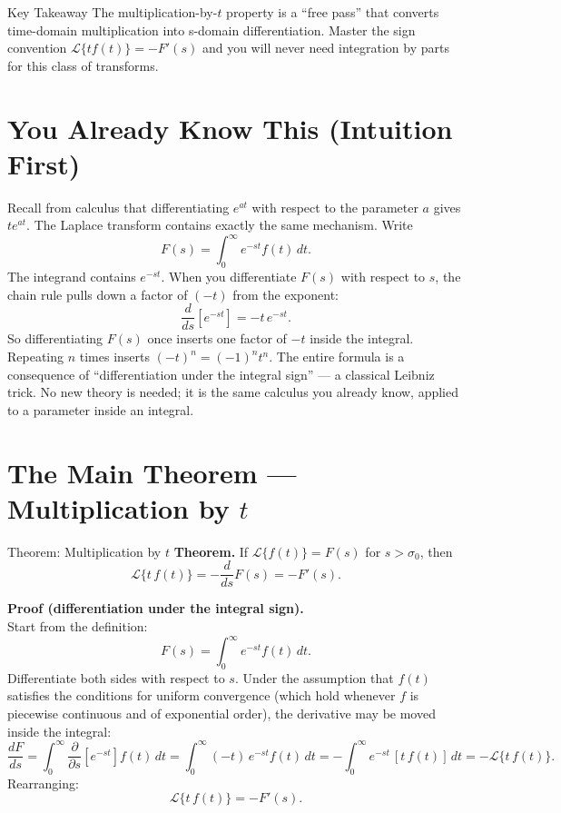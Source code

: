 \documentclass[12pt,a4paper]{article}
\begin{document}
\begin{learnbox}{Key Takeaway}
The multiplication-by-$t$ property is a ``free pass'' that converts time-domain
multiplication into s-domain differentiation. Master the sign convention
$\mathcal{L}\{tf(t)\} = -F'(s)$ and you will never need integration by parts
for this class of transforms.
\end{learnbox}

\section{You Already Know This (Intuition First)}
Recall from calculus that differentiating $e^{at}$ with respect to the parameter
$a$ gives $te^{at}$. The Laplace transform contains exactly the same mechanism.
Write
\[
  F(s) = \int_0^{\infty} e^{-st} f(t)\,dt.
\]
The integrand contains $e^{-st}$. When you differentiate $F(s)$ with respect to
$s$, the chain rule pulls down a factor of $(-t)$ from the exponent:
\[
  \frac{d}{ds}\left[e^{-st}\right] = -t\,e^{-st}.
\]
So differentiating $F(s)$ once inserts one factor of $-t$ inside the integral.
Repeating $n$ times inserts $(-t)^n = (-1)^n t^n$. The entire formula is a
consequence of ``differentiation under the integral sign'' --- a classical
Leibniz trick. No new theory is needed; it is the same calculus you already know,
applied to a parameter inside an integral.

\section{The Main Theorem --- Multiplication by $t$}
\begin{infobox}{Theorem: Multiplication by $t$}
\textbf{Theorem.} If $\mathcal{L}\{f(t)\} = F(s)$ for $s > \sigma_0$, then
\[
  \mathcal{L}\{t\,f(t)\} = -\frac{d}{ds}F(s) = -F'(s).
\]

\textbf{Proof (differentiation under the integral sign).}\\
Start from the definition:
\[
  F(s) = \int_0^{\infty} e^{-st} f(t)\,dt.
\]
Differentiate both sides with respect to $s$. Under the assumption that $f(t)$
satisfies the conditions for uniform convergence (which hold whenever $f$ is
piecewise continuous and of exponential order), the derivative may be moved inside
the integral:
\[
  \frac{dF}{ds} = \int_0^{\infty} \frac{\partial}{\partial s}\left[e^{-st}\right]
f(t)\,dt
  = \int_0^{\infty} (-t)\,e^{-st} f(t)\,dt
  = -\int_0^{\infty} e^{-st}\,[t\,f(t)]\,dt
  = -\mathcal{L}\{t\,f(t)\}.
\]
Rearranging:
\[
  \boxed{\mathcal{L}\{t\,f(t)\} = -F'(s).}
\]
\end{infobox}
\end{document}
